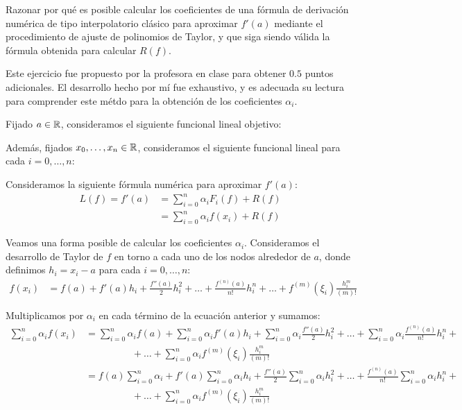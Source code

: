 \begin{ejercicio} Razonar por qué es posible calcular los coeficientes de una fórmula de derivación numérica de tipo interpolatorio clásico para aproximar $f'(a)$ mediante el procedimiento de ajuste de polinomios de Taylor, y que siga siendo válida la fórmula obtenida para calcular $R(f)$.
    \begin{observacion}
    Este ejercicio fue propuesto por la profesora en clase para obtener $0.5$ puntos adicionales. El desarrollo hecho por mí fue exhaustivo, y es adecuada su lectura para comprender este métdo para la obtención de los coeficientes $\alpha_i$.
    \end{observacion}


    Fijado $a\in \mathbb{R}$, consideramos el siguiente funcional lineal objetivo:

    Además, fijados $x_0,\dots,x_n\in \mathbb{R}$, consideramos el siguiente funcional lineal para cada $i=0,\dots,n$:

    Consideramos la siguiente fórmula numérica para aproximar $f'(a)$:
    \begin{align*}
        L(f) = f'(a) &= \sum_{i=0}^n \alpha_i F_i(f) + R(f)\\
        &= \sum_{i=0}^n \alpha_i f(x_i) + R(f)
    \end{align*}

    Veamos una forma posible de calcular los coeficientes $\alpha_i$.
    Consideramos el desarrollo de Taylor de $f$ en torno a cada uno de los nodos alrededor de $a$, donde definimos $h_i=x_i-a$ para cada $i=0,\dots,n$:
    \begin{align*}
        f(x_i) &= f(a) + f'(a)h_i + \frac{f''(a)}{2}h_i^2 + \dots + \frac{f^{(n)}(a)}{n!}h_i^n +\dots + f^{(m)}(\xi_i)\frac{h_i^{m}}{(m)!}
    \end{align*}

    Multiplicamos por $\alpha_i$ en cada término de la ecuación anterior y sumamos:
    \begin{align*}
        \sum_{i=0}^n \alpha_i f(x_i) &= \sum_{i=0}^n \alpha_i f(a) + \sum_{i=0}^n \alpha_i f'(a)h_i + \sum_{i=0}^n \alpha_i \frac{f''(a)}{2}h_i^2 + \dots + \sum_{i=0}^n \alpha_i \frac{f^{(n)}(a)}{n!}h_i^n +\\&\hspace{2cm}+\dots+ \sum_{i=0}^n \alpha_i f^{(m)}(\xi_i)\frac{h_i^{m}}{(m)!}\\
        &= f(a) \sum_{i=0}^n \alpha_i + f'(a) \sum_{i=0}^n \alpha_i h_i + \frac{f''(a)}{2} \sum_{i=0}^n \alpha_i h_i^2 + \dots + \frac{f^{(n)}(a)}{n!} \sum_{i=0}^n \alpha_i h_i^n +\\&\hspace{2cm}+\dots+ \sum_{i=0}^n \alpha_i f^{(m)}(\xi_i)\frac{h_i^{m}}{(m)!}
    \end{align*}


\end{ejercicio}
